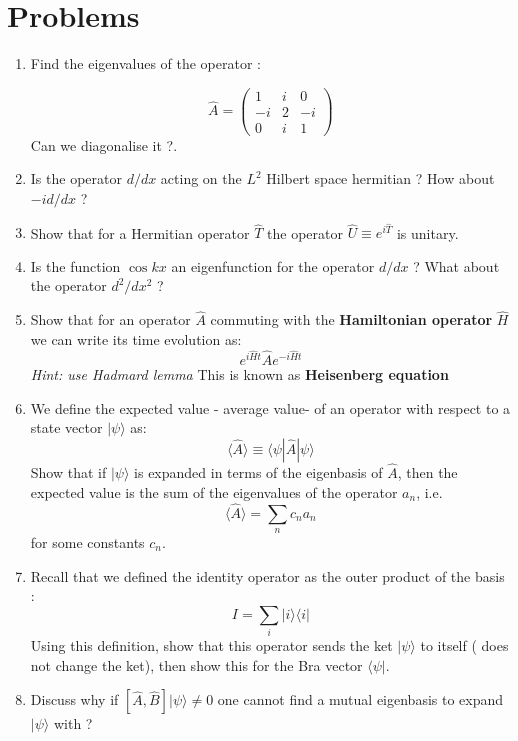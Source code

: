  \section{Problems}
 \begin{enumerate}
 	\item Find the eigenvalues of the operator :
 	
 	\[ \hat{A} =
 	\begin{pmatrix}
 	1& i&0\\
 	-i&2&-i\\
 	0&i&1
 	\end{pmatrix}
 	\]
 	Can we diagonalise it ?.
 	\item Is the operator $ d/dx$ acting on the $ L^2$ Hilbert space hermitian ? How about $ -i d/dx $ ?
 	\item Show that for a Hermitian operator $ \hat{T}$ the operator $ \hat{U}\equiv e ^ {i \hat{T}}$ is unitary.
 	\item Is the function $ \cos{kx}$ an eigenfunction for the operator $ d/dx$ ?  What about the operator $ d^2/dx^ 2$ ?
 	\item Show that for an operator $ \hat{A}$ commuting with the \textbf{Hamiltonian operator} $ \hat{H}$ we can write its time evolution as:
 	\[
 	e^{i\hat{H} t} \hat{A} e^{-i\hat{H} t}
 	\]
 	\textit{Hint: use Hadmard lemma}
 	This is known as \textbf{Heisenberg equation}
 	\item We define the expected value - average value- of an operator with respect to a state vector $ | \psi \rangle$ as:
 	\[
 	\langle \hat{A}\rangle \equiv\langle\psi|\hat{A} | \psi \rangle
 	\]
 	Show that if  $ | \psi \rangle$ is expanded in terms of the eigenbasis of $\hat{A}$, then the expected value is the sum of the eigenvalues of the operator $ a_n$, i.e. 
 	\[
 	\langle \hat{A}\rangle = \sum_n c_n a_n
 	\]
 	for some constants $c_n$.
 	\item Recall that we defined the identity operator as the outer product of the basis :
 	\[
 	I = \sum_i |i\rangle\langle i|
 	\]
 	Using this definition, show that this operator sends the ket $ | \psi\rangle$ to itself ( does not change the ket), then show this for the Bra vector $\langle \psi|$.
 	\item Discuss why if $ [ \hat{A}, \hat{B}] | \psi\rangle \neq 0 $ one cannot find a mutual eigenbasis to expand $| \psi\rangle$ with ?
 \end{enumerate}